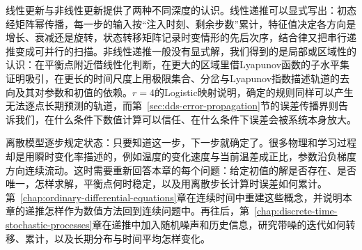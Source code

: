 线性更新与非线性更新提供了两种不同深度的认识。线性递推可以显式写出：初态经矩阵幂传播，每一步的输入按“注入时刻、剩余步数”累计，特征值决定各方向是增长、衰减还是旋转，状态转移矩阵记录时变情形的先后次序，结合律又把串行递推变成可并行的扫描。非线性递推一般没有显式解，我们得到的是局部或区域性的认识：在平衡点附近借线性化判断，在更大的区域里借Lyapunov函数的子水平集证明吸引，在更长的时间尺度上用极限集合、分岔与Lyapunov指数描述轨道的去向及其对参数和初值的依赖。$r=4$的Logistic映射说明，确定的规则同样可以产生无法逐点长期预测的轨道，而第~\ref{sec:dds-error-propagation}节的误差传播界则告诉我们，在什么条件下数值计算可以信任、在什么条件下误差会被系统本身放大。

离散模型逐步规定状态：只要知道这一步，下一步就确定了。很多物理和学习过程却是用瞬时变化率描述的，例如温度的变化速度与当前温差成正比，参数沿负梯度方向连续流动。这时需要重新回答本章的每个问题：给定初值的解是否存在、是否唯一，怎样求解，平衡点何时稳定，以及用离散步长计算时误差如何累计。第~\ref{chap:ordinary-differential-equations}章在连续时间中重建这些概念，并说明本章的递推怎样作为数值方法回到连续问题中。再往后，第~\ref{chap:discrete-time-stochastic-processes}章在递推中加入随机噪声和历史信息，研究带噪的迭代如何转移、累计，以及长期分布与时间平均怎样变化。
